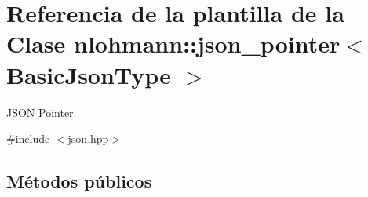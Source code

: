 \hypertarget{classnlohmann_1_1json__pointer}{}\section{Referencia de la plantilla de la Clase nlohmann\+:\+:json\+\_\+pointer$<$ Basic\+Json\+Type $>$}
\label{classnlohmann_1_1json__pointer}


J\+S\+ON Pointer.  




{\ttfamily \#include $<$json.\+hpp$>$}

\subsection*{Métodos públicos}
